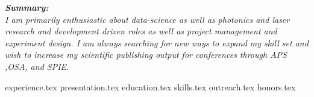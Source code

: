 \documentclass[11pt, a4paper]{awesome-cv}
\newcommand*{\sectiondir}{cv/}
\begin{document}
\makecvheader

\vspace{1.0mm}
\begin{justify}
\bodyfont\itshape\color{darktext}
\textbf{Summary:} \\ 
I am primarily enthusiastic about data-science as well as photonics and laser research and development driven roles as well as project management and experiment design. I am always searching for new ways to expand my skill set and wish to increase my scientific publishing output for conferences through APS ,OSA, and SPIE. 
\end{justify}
\vspace{1.0mm}

{experience.tex}
{presentation.tex}
{education.tex} 
\newpage
{skills.tex} 
\vspace{3.0mm}
{outreach.tex}
\vspace{3.0mm}
{honors.tex}
\end{document}
